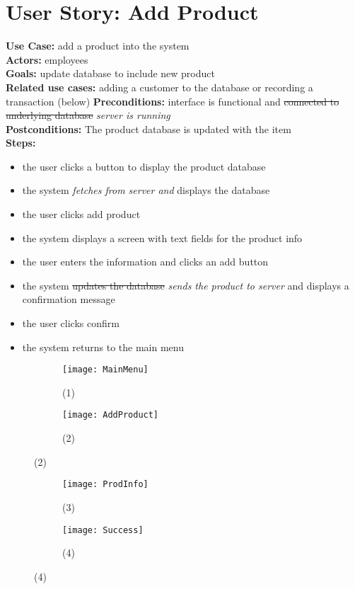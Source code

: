 \documentclass[notitlepage,11pt]{article}
\begin{document}
\section{User Story: Add Product}
\textbf{Use Case:} add a product into the system\\
	\textbf{Actors:} employees\\
	\textbf{Goals:} update database to include new product\\
	\textbf{Related use cases:} adding a customer to the database or recording a transaction (below)
	\textbf{Preconditions:} interface is functional and \sout{connected to underlying database} \emph{server is running}\\
	\textbf{Postconditions:} The product database is updated with the item\\
	\textbf{Steps:}
		\begin{itemize}
		\item[(1)] the user clicks a button to display the product database
		\item[(2)] the system \emph{fetches from server and} displays the database
		\item the user clicks add product
		\item[(3)] the system displays a screen with text fields for the product info
		\item the user enters the information and clicks an add button
		\item[(4)] the system \sout{updates the database} \emph{sends the product to server} and displays a confirmation message
		\item the user clicks confirm 
		\item[(1)] the system returns to the main menu
		\end{itemize}
\begin{figure}[h]
	\begin{subfigure}{.5\textwidth}
	\centering
	\texttt{[image: MainMenu]}
	\caption{(1)}
	\end{subfigure}%
	\begin{subfigure}{.5\textwidth}
	\centering
	\texttt{[image: AddProduct]}
	\caption{(2)}
	\end{subfigure}
\end{figure}
\begin{figure}[h]
	\begin{subfigure}{.5\textwidth}
	\centering
	\texttt{[image: ProdInfo]}
	\caption{(3)}
	\end{subfigure}%
	\begin{subfigure}{.5\textwidth}
	\centering
	\texttt{[image: Success]}
	\caption{(4)}
	\end{subfigure}
\end{figure}
\end{document}
